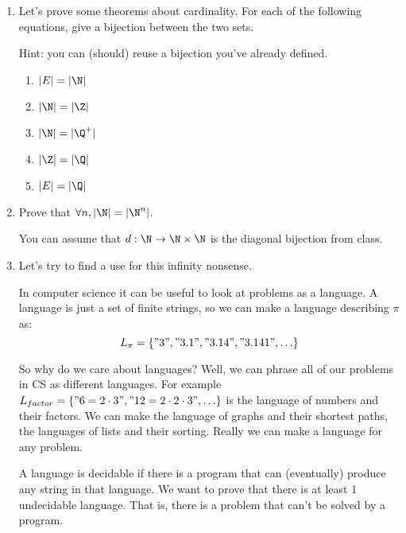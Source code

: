 \documentclass[basic, header]{nosvagor-notes}
\begin{document}
\begin{enumerate}[itemsep=4em]
  \item Let’s prove some theorems about cardinality. For each of the following
    equations, give a bijection between the two sets.

    Hint: you can (should) reuse a bijection you've already defined.
    \begin{enumerate}[leftmargin=2em]

      \item \(\displaystyle |E| = |\N| \)

      \item \(\displaystyle |\N| = |\Z| \)

      \item \(\displaystyle |\N| = |\Q^+| \)

      \item \(\displaystyle |\Z| = |\Q| \)

      \item \(\displaystyle |E| = |\Q| \)

    \end{enumerate}

  \newpage %

  \item Prove that \(\displaystyle \forall n, |\N| = |\N^n|\).

    You can assume that \(d : \N \to \N \times \N\) is the diagonal bijection
    from class.

  \newpage %

  \item Let's try to find a use for this infinity nonsense.

    In computer science it can be useful to look at problems as a language. A
    language is just a set of finite strings, so we can make a language
    describing $\pi$ as: \[L_\pi = \{"3", "3.1", "3.14", "3.141", \ldots\}\]

    So why do we care about languages?
    Well, we can phrase all of our problems in CS as different languages.
    For example $L_{factor} = \{"6=2\cdot3", "12=2\cdot2\cdot3", \ldots\}$
    is the language of numbers and their factors. We can make the language of
    graphs and their shortest paths, the languages of lists
    and their sorting. Really we can make a language for any problem.

    A language is decidable if there is a program that can (eventually)
    produce any string in that language. We want to prove that there is at
    least 1 undecidable language. That is, there is a problem that can’t be
    solved by a program.


\end{enumerate}
\end{document}
